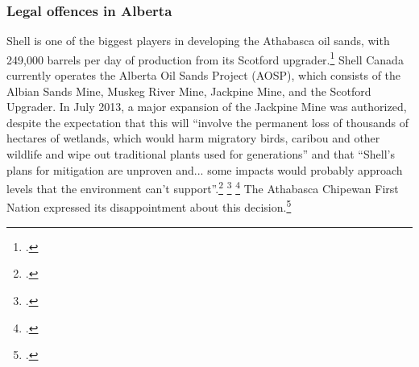	\subsubsection{Legal offences in Alberta}
	


Shell is one of the biggest players in developing the Athabasca oil sands, with 249,000 barrels per day of production from its Scotford upgrader.\footcite{AlbertaEnergy}
Shell Canada currently operates the Alberta Oil Sands Project (AOSP), which consists of the Albian Sands Mine, Muskeg River Mine, Jackpine Mine, and the Scotford Upgrader. 
In July 2013, a major expansion of the Jackpine Mine was authorized, despite the expectation that this will ``involve the permanent loss of thousands of hectares of wetlands, which would harm migratory birds, caribou and other wildlife and wipe out traditional plants used for generations'' and that ``Shell's plans for mitigation are unproven and... some impacts would probably approach levels that the environment can't support''.\footcite[][]{JointReviewPanelJackpine} \footcite[][]{AlbertaGreenlightsJackpine} \footcite[][]{JackpineConcerns}
The Athabasca Chipewan First Nation expressed its disappointment about this decision.\footcite[][]{ACFNDisappointed}




